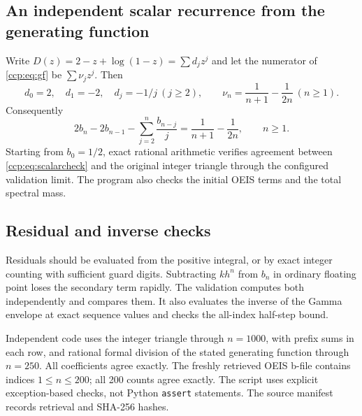 \documentclass[11pt,letterpaper]{article}
\theoremstyle{remark}\newtheorem{remark}[theorem]{Remark}
\begin{document}
\subsection{An independent scalar recurrence from the generating function}
Write $D(z)=2-z+\log(1-z)=\sum d_jz^j$ and let the numerator of \eqref{ccp:eq:gf} be $\sum \nu_jz^j$. Then
\[
d_0=2,\quad d_1=-2,\quad d_j=-1/j\ (j\ge2),
\qquad \nu_n=\frac1{n+1}-\frac1{2n}\ (n\ge1).
\]
Consequently
\begin{equation}
2b_n-2b_{n-1}-\sum_{j=2}^n\frac{b_{n-j}}j
 =\frac1{n+1}-\frac1{2n},\qquad n\ge1.\label{ccp:eq:scalarcheck}
\end{equation}
Starting from $b_0=1/2$, exact rational arithmetic verifies agreement between \eqref{ccp:eq:scalarcheck} and the original integer triangle through the configured validation limit. The program also checks the initial OEIS terms and the total spectral mass.

\subsection{Residual and inverse checks}
Residuals should be evaluated from the positive integral, or by exact integer counting with sufficient guard digits. Subtracting $kh^n$ from $b_n$ in ordinary floating point loses the secondary term rapidly. The validation computes both independently and compares them. It also evaluates the inverse of the Gamma envelope at exact sequence values and checks the all-index half-step bound.

Independent code uses the integer triangle through $n=1000$, with prefix sums
in each row, and rational formal division of the stated generating function
through $n=250$. All coefficients agree exactly. The freshly retrieved OEIS
b-file contains indices $1\le n\le200$; all 200 counts agree exactly.
The script uses explicit exception-based checks, not Python \texttt{assert}
statements. The source manifest records retrieval and SHA-256 hashes.
\end{document}
